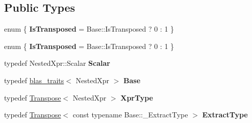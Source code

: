 \subsection*{Public Types}
\begin{DoxyCompactItemize}
\item 
\mbox{\label{struct_eigen_1_1internal_1_1blas__traits_3_01_transpose_3_01_nested_xpr_01_4_01_4_a2d6ea4d9aa84d41c8c4c6c2f1582cc95}} 
enum \{ {\bfseries Is\+Transposed} = Base\+:\+:Is\+Transposed ? 0 \+: 1
 \}
\item 
\mbox{\label{struct_eigen_1_1internal_1_1blas__traits_3_01_transpose_3_01_nested_xpr_01_4_01_4_a6aaea36091d49057a6fc286e3d8a5037}} 
enum \{ {\bfseries Is\+Transposed} = Base\+:\+:Is\+Transposed ? 0 \+: 1
 \}
\item 
\mbox{\label{struct_eigen_1_1internal_1_1blas__traits_3_01_transpose_3_01_nested_xpr_01_4_01_4_ab8f56c83a3977445c0f2fe1519ded7ab}} 
typedef Nested\+Xpr\+::\+Scalar {\bfseries Scalar}
\item 
\mbox{\label{struct_eigen_1_1internal_1_1blas__traits_3_01_transpose_3_01_nested_xpr_01_4_01_4_a98ee8e1e8d3feea2c0cc211608853721}} 
typedef \hyperlink{struct_eigen_1_1internal_1_1blas__traits}{blas\+\_\+traits}$<$ Nested\+Xpr $>$ {\bfseries Base}
\item 
\mbox{\label{struct_eigen_1_1internal_1_1blas__traits_3_01_transpose_3_01_nested_xpr_01_4_01_4_a8c6c7c398df3cc58c6326cbaa1e6d486}} 
typedef \hyperlink{group___core___module_class_eigen_1_1_transpose}{Transpose}$<$ Nested\+Xpr $>$ {\bfseries Xpr\+Type}
\item 
\mbox{\label{struct_eigen_1_1internal_1_1blas__traits_3_01_transpose_3_01_nested_xpr_01_4_01_4_adf8c914c5fc4062759771ec13db5e0f5}} 
typedef \hyperlink{group___core___module_class_eigen_1_1_transpose}{Transpose}$<$ const typename Base\+::\+\_\+\+Extract\+Type $>$ {\bfseries Extract\+Type}

\end{DoxyCompactItemize}
